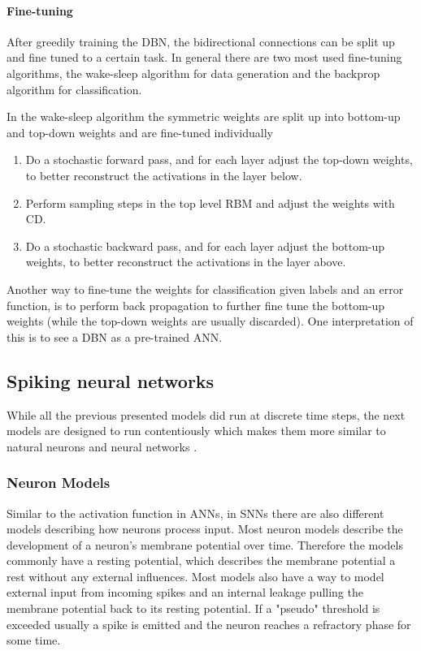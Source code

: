 \paragraph{Fine-tuning} \label{c:dbnfinetuning}

After greedily training the DBN, the bidirectional connections can be split up and fine tuned to a certain task.
In general there are two most used fine-tuning algorithms, the wake-sleep algorithm for data generation and the backprop algorithm for classification. 

In the wake-sleep algorithm the symmetric weights are split up into bottom-up and top-down weights and are fine-tuned individually \cite{hinton1995wake}
\begin{enumerate}
\item Do a stochastic forward pass, and for each layer adjust the top-down weights, to better reconstruct the activations in the layer below.
\item Perform sampling steps in the top level RBM and adjust the weights with CD.
\item Do a stochastic backward pass, and for each layer adjust the bottom-up weights, to better reconstruct the activations in the layer above.
\end{enumerate}

Another way to fine-tune the weights for classification given labels and an error function, is to perform back propagation to further fine tune the bottom-up weights (while the top-down weights are usually discarded). 
One interpretation of this is to see a DBN as a pre-trained ANN.

\subsection{Spiking neural networks} \label{c:snns}

While all the previous presented models did run at discrete time steps, the next models are designed to run contentiously which makes them more similar to natural neurons and neural networks \cite{maass1997networks}. 

\subsubsection{Neuron Models} \label{c:snnneurons}

Similar to the activation function in ANNs, in SNNs there are also different models describing how neurons process input.
Most neuron models describe the development of a neuron's membrane potential over time.
Therefore the models commonly have a resting potential, which describes the membrane potential a rest without any external influences. 
Most models also have a way to model external input from incoming spikes and an internal leakage pulling the membrane potential back to its resting potential. 
If a "pseudo" threshold is exceeded usually a spike is emitted and the neuron reaches a refractory phase for some time.

